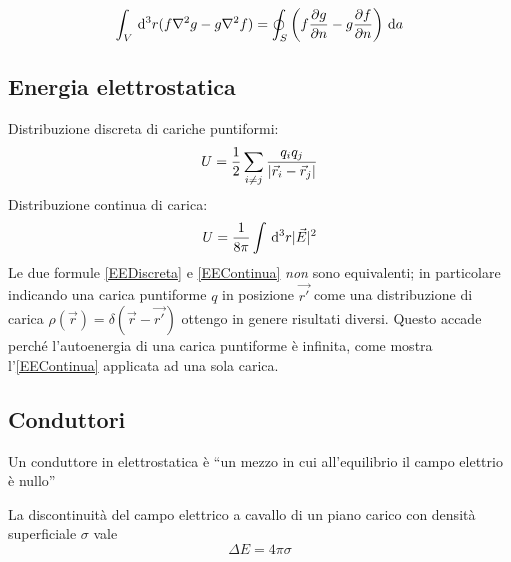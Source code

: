 \documentclass[../main.tex]{subfiles}
\begin{document}
\begin{theorem}
  \label{Green2}
  \begin{equation}
  \int_V \,\mathrm d^3 r (f \nabla^2 g - g \nabla^2 f) = \oint_S \left( f \frac{\partial g}{\partial n} - g \frac{\partial f}{\partial n} \right) \,\mathrm d a
  \end{equation}
\end{theorem}

\subsection{Energia elettrostatica}\label{EnergiaElettrostatica}
Distribuzione discreta di cariche puntiformi:
\begin{equation}
  \label{EEDiscreta}
  U= \frac{1}{2} \sum_{i\neq j} \frac{q_iq_j}{\lvert\vec r_i -\vec r_j\rvert}
\end{equation}
Distribuzione continua di carica:
\begin{equation}
  \label{EEContinua}
  U= \frac{1}{8\pi} \int \,\mathrm d^3 r \lvert\vec E\rvert^2
\end{equation}
Le due formule \cref{EEDiscreta} e \cref{EEContinua} \emph{non} sono equivalenti; in particolare indicando una carica puntiforme $q$ in posizione $\vec {r'}$ come una distribuzione di carica $\rho(\vec r)=\delta(\vec r - \vec {r'})$ ottengo in genere risultati diversi. Questo accade perch\'e l'autoenergia di una carica puntiforme \`e infinita, come mostra l'\cref{EEContinua} applicata ad una sola carica.

\subsection{Conduttori}\label{Conduttori}
\begin{definition}[Conduttore]
  Un conduttore in elettrostatica è ``un mezzo in cui all'equilibrio il campo elettrio è nullo'' 
\end{definition}
La discontinuità del campo elettrico a cavallo di un piano carico con densità superficiale $\sigma$ vale
\begin{equation}
  \label{DiscontinuitaSigma}
  \Delta E = 4 \pi \sigma
\end{equation}
\end{document}
